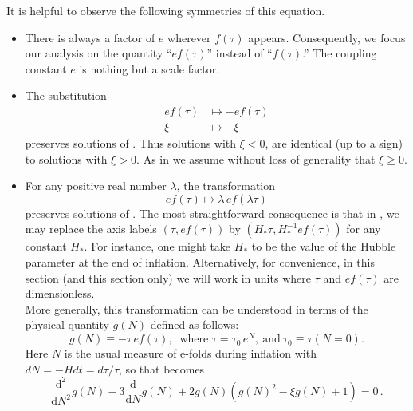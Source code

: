 It is helpful to observe the following symmetries of this equation. 
\begin{itemize}
\item There is always a factor of $e$ wherever $f(\tau)$ appears. Consequently, we focus our analysis on the quantity ``$ef(\tau)$'' instead of ``$f(\tau)$.'' The coupling constant $e$ is nothing but a scale factor. 
\item The substitution 
\begin{align*}
ef(\tau) & \mapsto-ef(\tau)\\
\xi & \mapsto-\xi
\end{align*}
preserves solutions of . Thus solutions with $\xi<0$, are identical (up to a sign) to solutions with $\xi>0$. As in  we assume without loss of generality that $\xi\geq0$. 
\item \label{enu:symmetry}For any positive real number $\lambda$, the transformation 
\begin{equation}
ef(\tau)\mapsto\lambda\,ef(\lambda\tau)\label{eq:symmetry3}
\end{equation}
preserves solutions of . The most straightforward consequence is that in , we may replace the axis labels $(\tau,ef(\tau))$ by $(H_{*}\tau,H_{*}^{-1}ef(\tau))$ for any constant $H_{*}$. For instance, one might take $H_{*}$ to be the value of the Hubble parameter at the end of inflation. Alternatively, for convenience, in this section (and this section only) we will work in units where $\tau$ and $ef(\tau)$ are dimensionless.\\
More generally, this transformation can be understood in terms of the physical quantity $g(N)$ defined as follows:  
\begin{equation}
g(N)\equiv-\tau\,ef(\tau),\ \textrm{ where }\tau=\tau_{0}\,e^{N},\ \textrm{and}\ \tau_{0}\equiv\tau(N=0).\label{eq:g-def}
\end{equation}
Here $N$ is the usual measure of e-folds during inflation with $dN=-Hdt=d\tau/\tau$, so that  becomes 
\begin{equation}
\frac{\mathrm{d}^{2}}{\mathrm{d}N^{2}}g(N)-3\frac{\mathrm{d}}{\mathrm{d}N}g(N)+2g(N)\left(g(N)^{2}-\xi g(N)+1\right)=0\,.\label{eq:g-of-N}
\end{equation}

\end{itemize}
